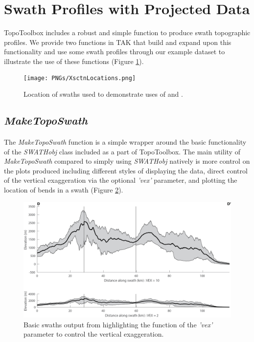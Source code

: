 \section{Swath Profiles with Projected Data}
\paragraph{}TopoToolbox includes a robust and simple function to produce swath topographic profiles. We provide two functions in TAK that build and expand upon this functionality and use some swath profiles through our example dataset to illustrate the use of these functions (Figure \ref{fig:XsctMap}).

\begin{figure}[H]
	\centering
	\texttt{[image: PNGs/XsctnLocations.png]}
	\caption{Location of swaths used to demonstrate uses of  and .}
	\label{fig:XsctMap}
\end{figure}

\subsection{\textit{MakeTopoSwath}} \label{sec:Swath}
\paragraph{}The \textit{MakeTopoSwath} function is a simple wrapper around the basic functionality of the \textit{SWATHobj} class included as a part of TopoToolbox. The main utility of \textit{MakeTopoSwath} compared to simply using \textit{SWATHobj} natively is more control on the plots produced including different styles of displaying the data, direct control of the vertical exaggeration via the optional \textit{'vex'} parameter, and plotting the location of bends in a swath (Figure \ref{fig:BasicSwath}).

\begin{figure}[H]
	\centering
	\includegraphics[width=16.5cm]{PNGs/SanJacinto_Swath.png}
	\caption{Basic swaths output from  highlighting the function of the \textit{'vex'} parameter to control the vertical exaggeration.}
	\label{fig:BasicSwath}
\end{figure}

